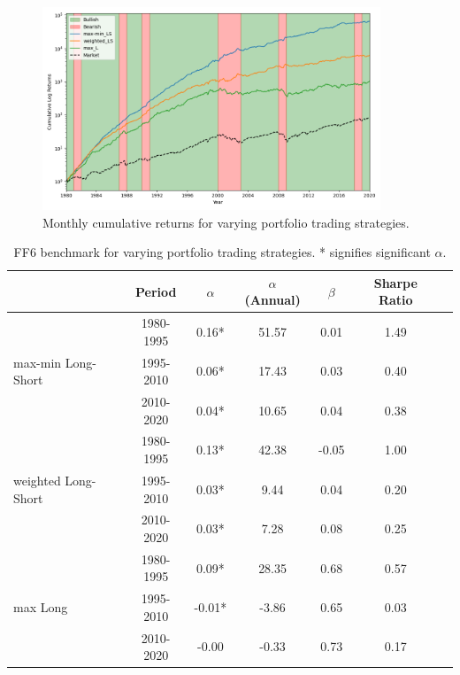 \documentclass{article}
\begin{document}
\begin{figure}[H]
    \centering
    \includegraphics[width=0.9\textwidth]{2020_plot5_portfolio_strategy_comparison.png}
    \caption{Monthly cumulative returns for varying portfolio trading strategies.}
    \label{fig:strategy_comp}
\end{figure}

\begin{table}[h]
    \centering
    \begin{tabular}{lcccccc}
        \toprule
        & Period & $\alpha$ & $\alpha$ (Annual) & $\beta$ & Sharpe Ratio \\
        \midrule
        \multirow{3}{*}{max-min Long-Short} & 1980-1995 & 0.16* & 51.57 & 0.01 & 1.49 \\
                                            & 1995-2010 & 0.06* & 17.43 & 0.03 & 0.40 \\
                                            & 2010-2020 & 0.04* & 10.65 & 0.04 & 0.38 \\
        \midrule
        \multirow{3}{*}{weighted Long-Short} & 1980-1995 & 0.13* & 42.38 & -0.05 & 1.00 \\
                                             & 1995-2010 & 0.03* & 9.44 & 0.04 & 0.20 \\
                                             & 2010-2020 & 0.03* & 7.28 & 0.08 & 0.25 \\
        \midrule
        \multirow{3}{*}{max Long} & 1980-1995 & 0.09* & 28.35 & 0.68 & 0.57 \\
                                  & 1995-2010 & -0.01* & -3.86 & 0.65 & 0.03 \\
                                  & 2010-2020 & -0.00 & -0.33 & 0.73 & 0.17 \\
        \bottomrule
    \end{tabular}
    \caption{FF6 benchmark for varying portfolio trading strategies. * signifies significant $\alpha$.}
    \label{tab:portfolio_strategy_comparison}
\end{table}
\end{document}
